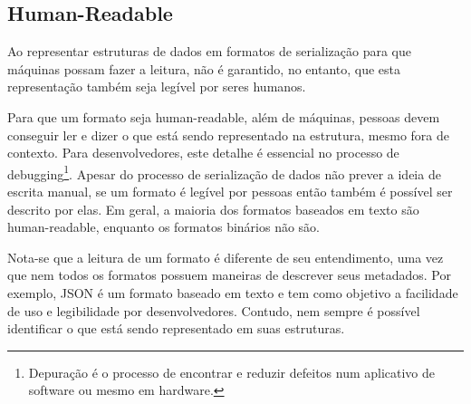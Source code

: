 \subsection[Human-Readable]{Human-Readable}

Ao representar estruturas de dados em formatos de serialização para que máquinas possam fazer a leitura, não é garantido, no entanto, que esta representação também seja legível por seres humanos.

Para que um formato seja human-readable, além de máquinas, pessoas devem conseguir ler e dizer o que está sendo representado na estrutura, mesmo fora de contexto. Para desenvolvedores, este detalhe é essencial no processo de debugging\footnote{
  Depuração é o processo de encontrar e reduzir defeitos num aplicativo de software ou mesmo em hardware.
}. Apesar do processo de serialização de dados não prever a ideia de escrita manual, se um formato é legível por pessoas então também é possível ser descrito por elas. Em geral, a maioria dos formatos baseados em texto são human-readable, enquanto os formatos binários não são. \cite{SumarayMakki2012}

Nota-se que a leitura de um formato é diferente de seu entendimento, uma vez que nem todos os formatos possuem maneiras de descrever seus metadados. Por exemplo, JSON é um formato baseado em texto e tem como objetivo a facilidade de uso e legibilidade por desenvolvedores. Contudo, nem sempre é possível identificar o que está sendo representado em suas estruturas.
